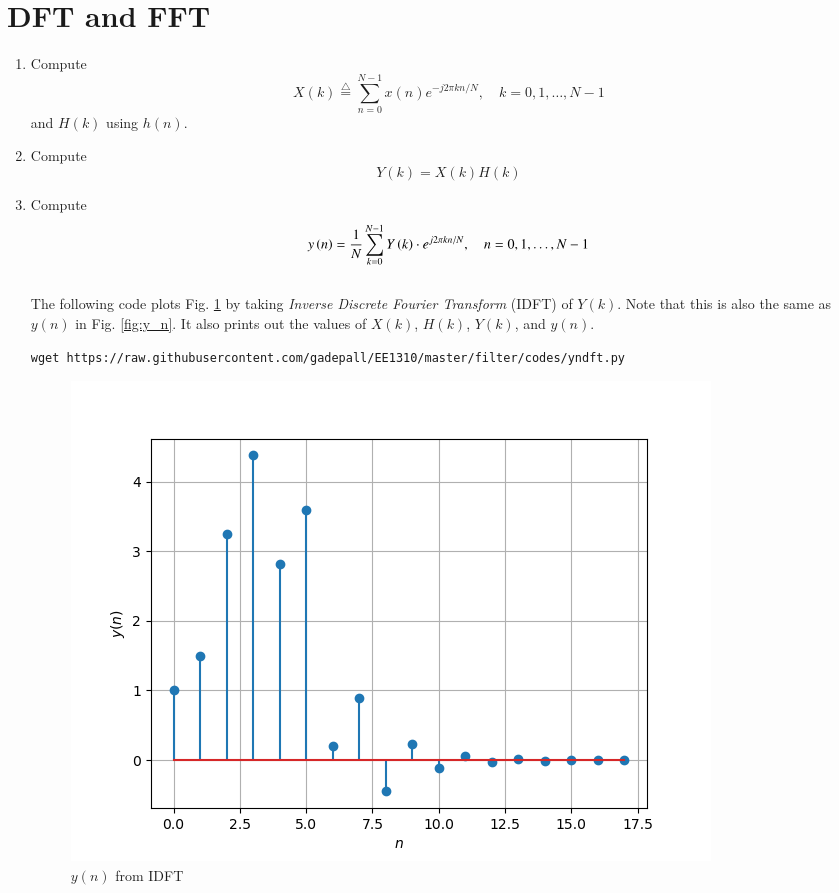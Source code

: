 \documentclass[journal,12pt,twocolumn]{IEEEtran}
\newcommand{\define}{\stackrel{\triangle}{=}}
\theoremstyle{remark}
\renewcommand\thesection{\arabic{section}}
\numberwithin{equation}{subsection}
\begin{document}
\section{DFT and FFT}
\begin{enumerate}[label=\thesection.\arabic*]
\item
Compute
\begin{equation}
X(k) \define \sum _{n=0}^{N-1}x(n) e^{-j2\pi kn/N}, \quad k = 0,1,\dots, N-1
\end{equation}
and $H(k)$ using $h(n)$.
\item Compute 
\begin{equation}
Y(k) = X(k)H(k) \label{eq:6.2}
\end{equation}
\item Compute
\begin{equation}
 y\left(n\right)={\frac {1}{N}}\sum _{k=0}^{N-1}Y\left(k\right)\cdot e^{j 2\pi kn/N},\quad n = 0,1,\dots, N-1
\end{equation}
\\
\solution The following code plots Fig. \ref{fig:yndft} by taking {\em Inverse Discrete Fourier Transform} (IDFT) of $Y(k)$. Note that this is also the same as 
$y(n)$ in  Fig. 
\ref{fig:y_n}. It also prints out the values of $X(k)$, $H(k)$, $Y(k)$, and $y(n)$.
%
\begin{lstlisting}
wget https://raw.githubusercontent.com/gadepall/EE1310/master/filter/codes/yndft.py
\end{lstlisting}
\begin{figure}[!ht]
\centering
\includegraphics[width=\columnwidth]{figs/6.1.png}
\caption{$y(n)$ from IDFT}
\label{fig:yndft}
\end{figure}


\end{enumerate}
\end{document}
